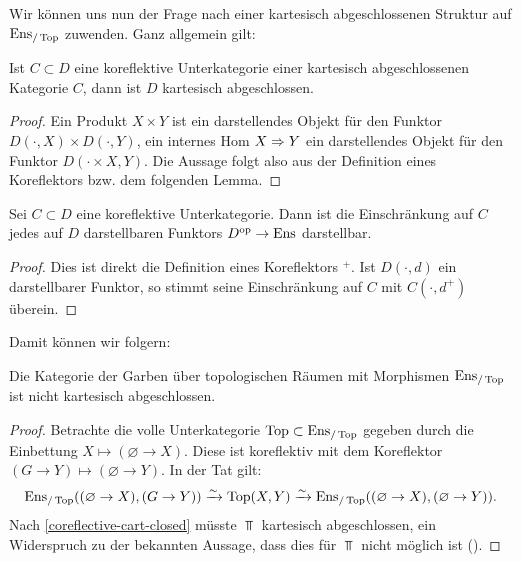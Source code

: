 Wir können uns nun der Frage nach einer kartesisch abgeschlossenen
Struktur auf $\operatorname{Ens}_{/\operatorname{Top}}$ zuwenden. Ganz allgemein gilt:
\begin{prop}
  Ist $C \subset D$ eine koreflektive Unterkategorie einer kartesisch
  abgeschlossenen Kategorie $C$, dann ist $D$ kartesisch
  abgeschlossen.
\end{prop}
\begin{proof}
  Ein Produkt $X \times Y$ ist ein darstellendes Objekt für den
  Funktor $D(\cdot, X) \times D(\cdot, Y)$, ein internes Hom $X
  \Rightarrow Y$ ein darstellendes Objekt für den Funktor $D(\cdot \times
  X, Y)$. Die Aussage folgt also aus der Definition eines Koreflektors
  bzw. dem folgenden Lemma.
\end{proof}
\begin{lemma}
  Sei $C \subset D$ eine koreflektive Unterkategorie. Dann ist die
  Einschränkung auf $C$ jedes auf $D$ darstellbaren Funktors $D^\mathrm{op} \to
  \operatorname{Ens}$ darstellbar.
\end{lemma}
\begin{proof}
  Dies ist direkt die Definition eines Koreflektors $^+$. Ist
  $D(\cdot, d)$ ein darstellbarer Funktor, so stimmt seine
  Einschränkung auf $C$ mit $C(\cdot, d^+)$ überein.
\end{proof}

Damit können wir folgern:
\begin{prop} \label{full-enstop-not-cart-closed}
  Die Kategorie der Garben über topologischen Räumen mit Morphismen
  $\operatorname{Ens}_{/\operatorname{Top}}$ ist nicht kartesisch abgeschlossen.
\end{prop}
\begin{proof}
  Betrachte die volle Unterkategorie $\operatorname{Top} \subset \operatorname{Ens}_{/\operatorname{Top}}$ gegeben
  durch die Einbettung $X \mapsto (\varnothing \to X)$. Diese ist
  koreflektiv mit dem Koreflektor $(G \to Y) \mapsto (\varnothing \to
  Y)$. In der Tat gilt:
  \[ \operatorname{Ens}_{/\operatorname{Top}}((\varnothing \to X), (G \to Y)) \xrightarrow[]{\sim} \operatorname{Top}(X, Y)
  \xrightarrow[]{\sim} \operatorname{Ens}_{/\operatorname{Top}}((\varnothing \to X), (\varnothing \to Y)).
  \]
  Nach \ref{coreflective-cart-closed} müsste $\Top$ kartesisch
  abgeschlossen, ein Widerspruch zu der bekannten Aussage, dass dies
  für $\Top$ nicht möglich ist (\cite{??}).
\end{proof}

